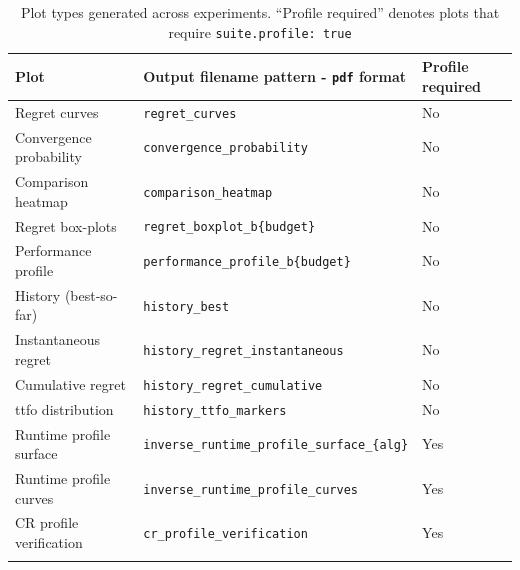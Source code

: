 \small
\begin{longtable}{p{4cm}p{8cm}p{2cm}}
  \hline
  \textbf{Plot} & \textbf{Output filename pattern - \texttt{\acrshort{pdf}}
  format} & \textbf{Profile required} \\
  \hline
  Regret curves            & \texttt{regret\_curves}
  & No \\
  Convergence probability  & \texttt{convergence\_probability}
  & No \\
  Comparison heatmap       & \texttt{comparison\_heatmap}
  & No \\
  Regret box-plots          & \texttt{regret\_boxplot\_b\{budget\}}
  & No \\
  Performance profile      &
  \texttt{performance\_profile\_b\{budget\}}    & No \\
  History (best-so-far)    & \texttt{history\_best}
  & No \\
  Instantaneous regret     &
  \texttt{history\_regret\_instantaneous}       & No \\
  Cumulative regret        & \texttt{history\_regret\_cumulative}
  & No \\
  \acrshort{ttfo} distribution        &
  \texttt{history\_ttfo\_markers}               & No \\
  Runtime profile surface  &
  \texttt{inverse\_runtime\_profile\_surface\_\{alg\}} & Yes \\
  Runtime profile curves   &
  \texttt{inverse\_runtime\_profile\_curves}   & Yes \\
  CR profile verification  & \texttt{cr\_profile\_verification}
  & Yes \\
  \hline
  \caption[Generated experiment plot types]{Plot types generated
    across experiments. ``Profile required'' denotes
  plots that require \texttt{suite.profile:~true}}
  \label{tab:plot-types}
\end{longtable}

